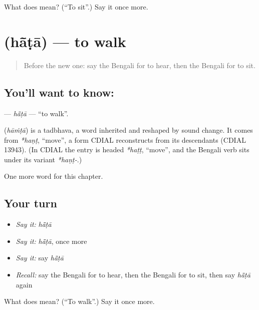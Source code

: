 \begin{tcolorbox}[breakable,colback=teal!4,colframe=teal!35!black,title={Before you move on}]
What does  mean? (\textquotedblleft{}To sit\textquotedblright{}.) Say it once more.
\end{tcolorbox}
\section[\texorpdfstring{\bn{হাঁটা} (hā̃ṭā)}{হাঁটা (hā̃ṭā)}]{ (hā̃ṭā) — to walk}

\label{lesson:BN-C48-hata}



\begin{quote}
Before the new one: say the Bengali for to hear, then the Bengali for to sit.
\end{quote}

\subsection*{You'll want to know: }
\textbf{} — \emph{hā̃ṭā} — \textquotedblleft{}to walk\textquotedblright{}.

\begin{cousinweb}
\textbf{} (\emph{hāṁṭā}) is a tadbhava, a word inherited and reshaped by sound change. It comes from \emph{*haṇṭ}, \textquotedblleft{}move\textquotedblright{}, a form CDIAL reconstructs from its descendants (CDIAL 13943). (In CDIAL the entry is headed \emph{*haṭṭ}, \textquotedblleft{}move\textquotedblright{}, and the Bengali verb sits under its variant \emph{*haṇṭ-}.)
\end{cousinweb}

\begin{grammarlens}[title={What you've built}]
One more word for this chapter.
\end{grammarlens}

\subsection*{Your turn}
\begin{itemize}
\raggedright
  \item \emph{Say it:} \emph{hā̃ṭā}
  \item \emph{Say it:} \emph{hā̃ṭā}, once more
  \item \emph{Say it:} say \emph{hā̃ṭā}
  \item \emph{Recall:} say the Bengali for to hear, then the Bengali for to sit, then say \emph{hā̃ṭā} again
\end{itemize}

\begin{tcolorbox}[breakable,colback=teal!4,colframe=teal!35!black,title={Before you move on}]
What does  mean? (\textquotedblleft{}To walk\textquotedblright{}.) Say it once more.
\end{tcolorbox}
